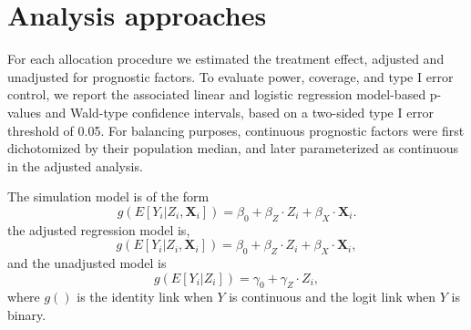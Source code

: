 \endgroup{}


\begin{comment}

Variable (notation)
Description
Associated parameters
Cardinality
Response (Y)
Binary outcome, with marginal prevalence p_Y 
p_Y = {0.1, 0.5}

2 dichotomous
1 continuous = 3

Treatment assignment (Z)
Treatment assignment is 0 or 1 with probability p_alloc.
p_alloc = {0.5}
1
Balancing factors (X)
Pre-specified risk factors predictive of outcome measure.
Continuous covariates dichotomized by population median.
numX = {1,2}
probsX = {0.25, 0.5}

2 dichotomous
1 continuous = 3
Entry time (T)
Observed entry time
-
1
Trial size (n)
Overall sample size 
n = {32, 96}
2
Effect size for treatment assignment and prognostic factors.
Magnitude of effect varied from
-	None: exp(bX) = 1.0
-	Low: exp(bX) = 1.1
-	High: exp(bX) = 3
bZ = {log(1.0), log(3)}
bX = {log(1.1), log(3)}
2 * 2 = 4
Effect size for drift
Magnitude of effect varied from
-	None: exp(bT) = 1.0
-	Severe: exp(bT) = 3
bT = {log(1.0), log(3)}
2

\end{comment}


\section{Analysis approaches}
For each allocation procedure we estimated the treatment effect, adjusted and unadjusted for prognostic factors.  To evaluate power, coverage, and type I error control, we report the associated linear and logistic regression model-based p-values and Wald-type confidence intervals, based on a two-sided type I error threshold of 0.05.  For balancing purposes, continuous prognostic factors were first dichotomized by their population median, and later parameterized as continuous in the adjusted analysis.

The simulation model is of the form
\begin{equation}
g(E[Y_i|Z_i, \mathbf{X}_i]) = \beta_0 + \beta_Z \cdot Z_i + \beta_X \cdot \mathbf{X}_{i}.
\end{equation}
the adjusted regression model is,
\begin{equation}
g(E[Y_i|Z_i, \mathbf{X}_i]) = \beta_0 + \beta_Z \cdot Z_i + \beta_X \cdot \mathbf{X}_{i},
\end{equation}
and the unadjusted model is
\begin{equation}
g(E[Y_i|Z_i]) = \gamma_0 + \gamma_Z \cdot Z_i,
\end{equation}
where $g()$ is the identity link when $Y$ is continuous and the logit link when $Y$ is binary.

